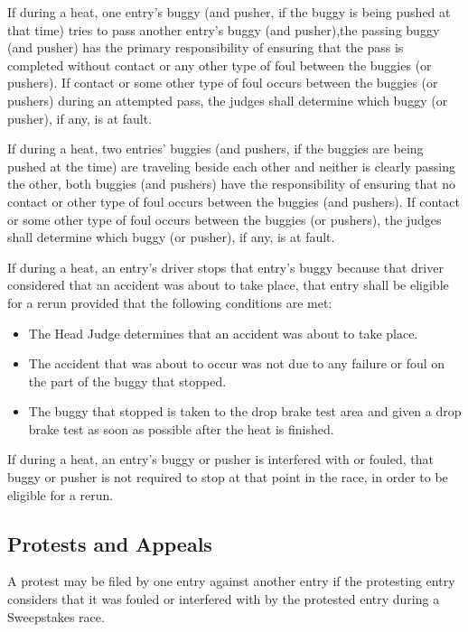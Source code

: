 	If during a heat, one entry's buggy (and pusher, if the buggy is being pushed
	at that time) tries to pass another entry's buggy (and pusher),the passing
	buggy (and pusher) has the primary responsibility of ensuring that the pass is
	completed without contact or any other type of foul between the buggies (or
	pushers). If contact or some other type of foul occurs between the buggies (or
	pushers) during an attempted pass, the judges shall determine which buggy (or
	pusher), if any, is at fault.

	If during a heat, two entries' buggies (and pushers, if the buggies are being
	pushed at the time) are traveling beside each other and neither is clearly
	passing the other, both buggies (and pushers) have the responsibility of
	ensuring that no contact or other type of foul occurs between the buggies (and
	pushers). If contact or some other type of foul occurs between the buggies (or
	pushers), the judges shall determine which buggy (or pusher), if any, is at
	fault.

	If during a heat, an entry's driver stops that entry's buggy because that
	driver considered that an accident was about to take place, that entry shall be
	eligible for a rerun provided that the following conditions are met:

		\begin{itemize}

			\item The Head Judge determines that an accident was about to take
			place.

			\item The accident that was about to occur was not due to any failure
			or foul on the part of the buggy that stopped.

			\item The buggy that stopped is taken to the drop brake test area and
			given a drop brake test as soon as possible after the heat is finished.

		\end{itemize}

	If during a heat, an entry's buggy or pusher is interfered with or fouled, that
	buggy or pusher is not required to stop at that point in the race, in order to
	be eligible for a rerun.

\subsection{Protests and Appeals}

	A protest may be filed by one entry against another entry if the protesting
	entry considers that it was fouled or interfered with by the protested entry
	during a Sweepstakes race.

